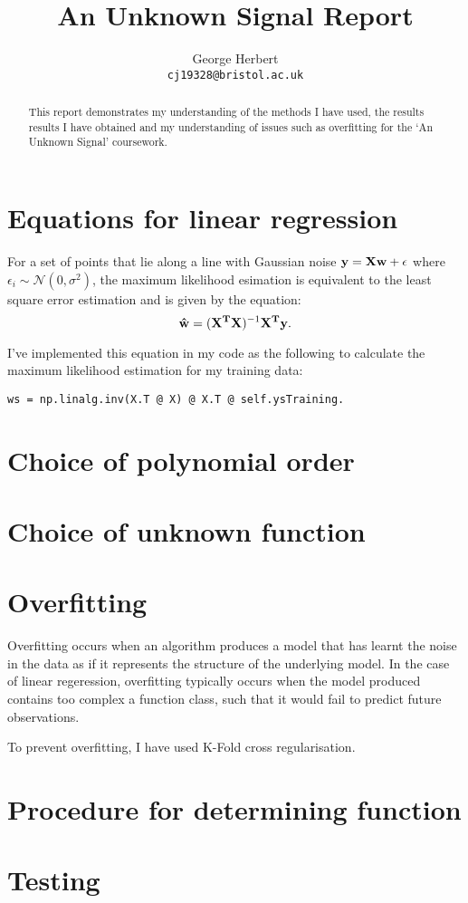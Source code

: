 \documentclass[onecolumn, 12pt, a4paper]{article}
\author{
  George Herbert\\
  \texttt{cj19328@bristol.ac.uk}
}
\title{An Unknown Signal Report}
\begin{document}
\maketitle

\begin{abstract}
    This report demonstrates my understanding of the methods I have 
    used, the results results I have obtained and my understanding
    of issues such as overfitting for the `An Unknown Signal'
    coursework.
\end{abstract}

\section{Equations for linear regression}

For a set of points that lie along a line with Gaussian noise 
$\vb{y} = \vb{X}\vb{w} + \vb{\epsilon}$ where $\epsilon_{i} \sim \mathcal{N}(0, \sigma^{2})$,
the maximum likelihood esimation is equivalent to the least square 
error estimation and is given by the equation:
\[
    \vb{\hat{w}} = (\vb{X^{T}}\vb{X})^{-1}\vb{X^{T}}\vb{y}.
\]

I've implemented this equation in my code as the following to calculate
the maximum likelihood estimation for my training data:
\begin{verbatim}
ws = np.linalg.inv(X.T @ X) @ X.T @ self.ysTraining.
\end{verbatim}

\section{Choice of polynomial order}

\section{Choice of unknown function}

\section{Overfitting}

Overfitting occurs when an algorithm produces a model that has
learnt the noise in the data as if it represents the
structure of the underlying model.
In the case of linear regeression, overfitting typically occurs
when the model produced contains too complex a function class,
such that it would fail to predict future observations.

To prevent overfitting, I have used K-Fold cross regularisation.

\section{Procedure for determining function}

\section{Testing}
\end{document}
